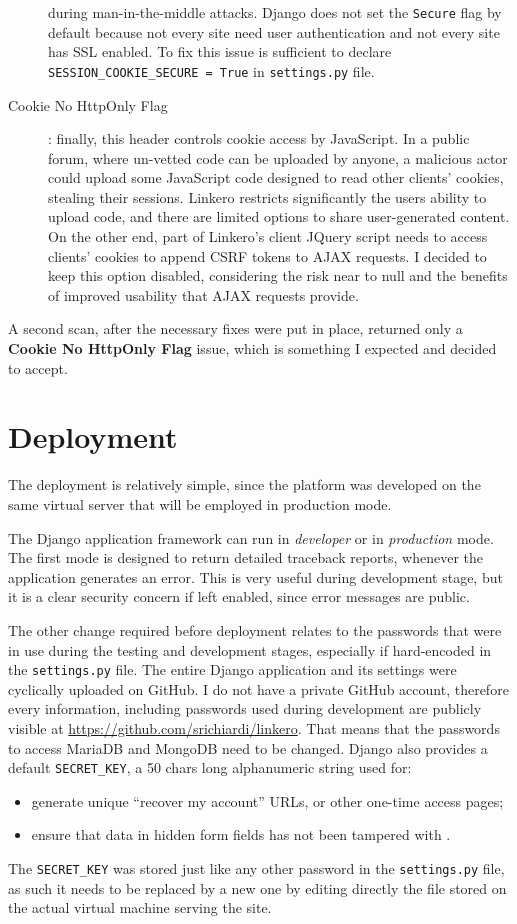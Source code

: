 \begin{description}
  during man-in-the-middle attacks. Django does not set the \texttt{Secure} flag
  by default because not every site need user authentication and not every site has
  SSL enabled. To fix this issue is sufficient to declare
  \texttt{SESSION\_COOKIE\_SECURE = True} in \texttt{settings.py} file.
  \item[Cookie No HttpOnly Flag]: finally, this header controls cookie access by
  JavaScript. In a public forum, where un-vetted code can be uploaded by anyone,
  a malicious actor could upload some JavaScript code designed to read other
  clients' cookies, stealing their sessions. Linkero restricts significantly the
  users ability to upload code, and there are limited options to share
  user-generated content. On the other end, part of Linkero's client JQuery
  script needs to access clients' cookies to append CSRF tokens to AJAX
  requests. I decided to keep this option disabled, considering the risk near to
  null and the benefits of improved usability that AJAX requests provide.
\end{description}

A second scan, after the necessary fixes were put in place, returned only a
\textbf{Cookie No HttpOnly Flag} issue, which is something I expected and
decided to accept.


\section{Deployment}
The deployment is relatively simple, since the platform was developed on the same
virtual server that will be employed in production mode.

The Django application framework can run in \emph{developer} or in
\emph{production} mode. The first mode is designed to return detailed traceback
reports, whenever the application generates an error. This is very useful during
development stage, but it is a clear security concern if left enabled, since
error messages are public.

The other change required before deployment relates to the passwords that were
in use during the testing and development stages, especially if hard-encoded in
the \texttt{settings.py} file. The entire Django application and its settings were
cyclically uploaded on GitHub\texttrademark. I do not have a private
GitHub account, therefore every information, including passwords used during
development are publicly visible at \url{https://github.com/srichiardi/linkero}.
That means that the passwords to access MariaDB and MongoDB need to be changed.
Django also provides a default \texttt{SECRET\_KEY}, a 50 chars long
alphanumeric string used for:
\begin{itemize}
  \item generate unique ``recover my account'' URLs, or other one-time access
  pages;
  \item ensure that data in hidden form fields has not been tampered with
  \cite{djsecr}.
\end{itemize}
The \texttt{SECRET\_KEY} was stored just like any other password in the
\texttt{settings.py} file, as such it needs to be replaced by a new one
by editing directly the file stored on the actual virtual machine serving
the site.
